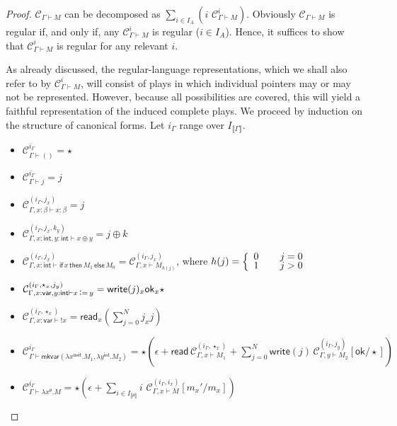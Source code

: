 \documentclass{CSML}
\theoremstyle{definition}\newtheorem{definition}[thm]{Definition}
\theoremstyle{definition}\newtheorem{example}[thm]{Example}
\theoremstyle{definition}\newtheorem{proposition}[thm]{Proposition}
\theoremstyle{definition}\newtheorem{lemma}[thm]{Lemma}
\theoremstyle{definition}\newtheorem{theorem}[thm]{Theorem}
\theoremstyle{definition}\newtheorem{corollary}[thm]{Corollary}
\theoremstyle{definition}\newtheorem{remark}[thm]{Remark}
\newcommand\mwrite[1]{\mathsf{write}(#1)}
\newcommand\mread{\mathsf{read}}
\newcommand\mok{\mathsf{ok}}
\newcommand\compi[2]{\mathcal{C}_{#1}^{#2}}
\newcommand\comp[1]{\mathcal{C}_{#1}}
\newcommand\badvar[2]{\mathsf{mkvar}(#1,#2)}
\newcommand{\aasg}{\,\raisebox{0.065ex}{:}{=}\,}
\newcommand\comt{\mathsf{unit}}
\newcommand\expt{\mathsf{int}}
\newcommand\vart{\mathsf{var}}
\newcommand\cond[3]{\mathsf{if}\,#1\,\mathsf{then}\,#2\,\mathsf{else}\,#3}
\newcommand\sem[1]{\llbracket #1 \rrbracket}
\newcommand\seq[2]{{#1} \vdash {#2}}
\begin{document}
\begin{proof}
$\comp{\seq{\Gamma}{M}}$ can be decomposed as $\sum_{i\in I_A}(i\,\, \comp{\seq{\Gamma}{M}}^i)$. Obviously $\comp{\seq{\Gamma}{M}}$
is regular if, and only if, any $\comp{\seq{\Gamma}{M}}^i$ is regular ($i\in I_A$). Hence, it suffices to show
that $\comp{\seq{\Gamma}{M}}^i$ is regular for any relevant $i$.

As already discussed, the regular-language representations, which we shall also refer to by $\compi{\seq{\Gamma}{M}}{i}$,
will consist of plays in which individual pointers may or may not be represented. However, because all possibilities are covered, 
this will yield a faithful representation of the induced complete plays.
We proceed by induction on the structure of canonical forms. Let $i_\Gamma$ range over $I_{\sem{\Gamma}}$. 
\begin{itemize}
\item $\compi{\seq{\Gamma}{()}}{i_\Gamma}=\star$
\item $\compi{\seq{\Gamma}{j}}{i_\Gamma}=j$
\item $\compi{\seq{\Gamma,x:\beta}{x:\beta}}{(i_\Gamma,j_x)}=j$
\item $\compi{\seq{\Gamma,x:\expt,y:\expt}{x\oplus y}}{(i_\Gamma, j_x, k_y)}=j\oplus k$
\item $\compi{\seq{\Gamma,x:\expt}{\cond{x}{M_1}{M_0}}}{(i_\Gamma,j_x)}=\compi{\seq{\Gamma,x}{M_{h(j)}}}{(i_\Gamma,j_x)}$, 
where $h(j)=\left\{\renewcommand\arraystretch{.7}\begin{array}{lcl} 0 &\,& j=0\\ 1 && j>0\end{array}\right.$
\item $\compi{\seq{\Gamma,x:\vart,y:\expt}{x\aasg y}}{(i_\Gamma,\star_x,j_y)}=\mwrite{j}_x\mok_x\star$
\item $\compi{\seq{\Gamma,x:\vart}{!x}}{(i_\Gamma,\star_x)}=\mread_x (\sum_{j=0}^{N} j_x j)$
\item $\compi{\seq{\Gamma}{\badvar{\lambda x^\comt.M_1}{\lambda y^\expt.M_2}}}{i_\Gamma}=
\star (\epsilon+\mread\,\compi{\seq{\Gamma,x}{M_1}}{(i_\Gamma,\star_x)}+\sum_{j=0}^N \mwrite{j}\, \compi{\seq{\Gamma,y}{M_2}}{(i_\Gamma,j_y)}[\mok/\star])$

\item $\compi{\seq{\Gamma}{\lambda x^\theta.M}}{i_\Gamma}=\star(\epsilon+\sum_{i\in I_{\sem{\theta}}} i\,\,\compi{\seq{\Gamma,x}{M}}{(i_\Gamma,i_x)}[m_x'/m_x]  )$


\end{itemize}
\end{proof}
\end{document}
